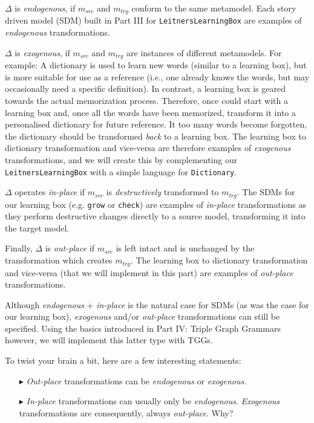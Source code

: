 $\Delta$ is \emph{endogenous}, if $m_{src}$ and $m_{trg}$ conform to the same metamodel. Each story driven model (SDM) built in Part III for
\texttt{LeitnersLearningBox} are examples of \emph{endogenous} transformations.

$\Delta$ is \emph{exogenous}, if $m_{src}$ and $m_{trg}$ are instances of different metamodels. For example: A dictionary is used to learn new
words (similar to a learning box), but is more suitable for use as a reference (i.e., one already knows the words, but may occasionally need a specific
definition). In contrast, a learning box is geared towards the actual memorization process. Therefore, once could start with a learning box and, once all the
words have been memorized, transform it into a personalised dictionary for future reference. It too many words become forgotten, the dictionary should be
transformed \emph{back} to a learning box. The learning box to dictionary transformation and vice-versa are therefore examples of \emph{exogenous}
transformations, and we will create this by complementing our \texttt{LeitnersLearningBox} with a simple language for \texttt{Dictionary}.

$\Delta$ operates \emph{in-place} if $m_{src}$ is \emph{destructively} transformed to $m_{trg}$. The SDMs for our
learning box (e.g. \texttt{grow} or \texttt{check}) are examples of \emph{in-place} transformations as they perform destructive changes directly to a source
model, transforming it into the target model.

Finally, $\Delta$ is \emph{out-place} if $m_{src}$ is left intact and is unchanged by the transformation which
creates $m_{trg}$. The learning box to dictionary transformation and vice-versa (that we will implement in this part) are examples of \emph{out-place}
transformations.

Although \emph{endogenous} + \emph{in-place} is the natural case for SDMs (as was the case for our learning box), \emph{exogenous} and/or \emph{out-place}
transformations can still be specified. Using the basics introduced in Part IV: Triple Graph Grammars however, we will implement this latter type with
TGGs.
 
\newpage
 
To twist your brain a bit, here are a few interesting statements:
\begin{enumerate}

\item[$\blacktriangleright$] \emph{Out-place} transformations can be \emph{endogenous} or \emph{exogenous}.

\item[$\blacktriangleright$] \emph{In-place} transformations can usually only be \emph{endogenous}. \emph{Exo\-gen\-ous} transformations are consequently,
always \emph{out-place}.  Why?

\end{enumerate}  

